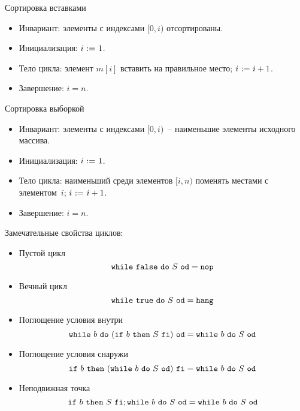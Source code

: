 \documentclass[landscape]{slides}
\begin{document}
\begin{slide}
Сортировка вставками
\begin{itemize}
    \item Инвариант: элементы с индексами $[0,i)$ отсортированы.
    \item Инициализация: $i\ \mathtt{:=}\  1$.
    \item Тело цикла: элемент $m[i]$ вставить на правильное место; $i\ \mathtt{:=}\  i+1$.
    \item Завершение: $i = n$.
\end{itemize}
\end{slide}

\begin{slide}
Сортировка выборкой
\begin{itemize}
    \item Инвариант: элементы с индексами $[0,i)$~-- наименьшие элементы исходного массива.
    \item Инициализация: $i\ \mathtt{:=}\  1$.
    \item Тело цикла: наименьший среди элементов $[i,n)$ поменять местами с элементом~$i$; $i\ \mathtt{:=}\  i+1$.
    \item Завершение: $i = n$.
\end{itemize}
\end{slide}

\begin{slide}
    Замечательные свойства циклов:

    \begin{itemize}
    \item Пустой цикл
    \[
        \mathtt{while}\ {\mathtt{false}}\ \mathtt{do}\ {S}\ \mathtt{od} = \mathtt{nop}
    \]
    \item Вечный цикл
    \[
        \mathtt{while}\ {\mathtt{true}}\ \mathtt{do}\ {S}\ \mathtt{od} = \mathtt{hang}
    \]
    \item Поглощение условия внутри
    \[
        \mathtt{while}\ {b}\ \mathtt{do}\ {(\mathtt{if}\ {b}\ \mathtt{then}\ {S}\ \mathtt{fi})}\ \mathtt{od} = \mathtt{while}\ {b}\ \mathtt{do}\ {S}\ \mathtt{od}
    \]
    \item Поглощение условия снаружи
    \[
        \mathtt{if}\ {b}\ \mathtt{then}\ {(\mathtt{while}\ {b}\ \mathtt{do}\ {S}\ \mathtt{od})}\ \mathtt{fi} = \mathtt{while}\ {b}\ \mathtt{do}\ {S}\ \mathtt{od}
    \]
    \item Неподвижная точка
    \[
        \mathtt{if}\ {b}\ \mathtt{then}\ {S}\ \mathtt{fi} ; \mathtt{while}\ {b}\ \mathtt{do}\ {S}\ \mathtt{od} = \mathtt{while}\ {b}\ \mathtt{do}\ {S}\ \mathtt{od}
    \]
    \end{itemize}
\end{slide}
\end{document}
